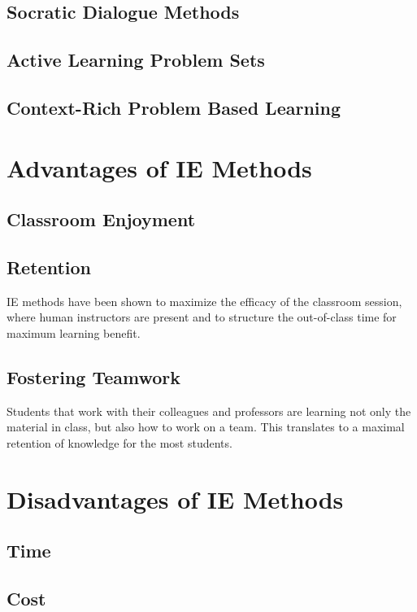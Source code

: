 \subsection{Socratic Dialogue Methods}
\subsection{Active Learning Problem Sets}
\subsection{Context-Rich Problem Based Learning}

\section{Advantages of IE Methods}

\subsection{Classroom Enjoyment}

\subsection{Retention}

IE methods have been shown to maximize the efficacy of the classroom session, where human instructors are present and to structure the out-of-class time for maximum learning benefit.

\subsection{Fostering Teamwork}

Students that work with their colleagues and professors are learning not only the material in class, but also how to work on a team. This translates to a maximal retention of knowledge for the most students\cite{novak1999}.

\section{Disadvantages of IE Methods}

\subsection{Time}
\subsection{Cost}

